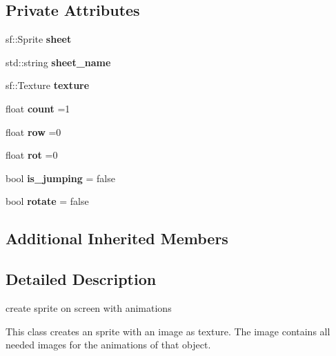 \subsection*{Private Attributes}
\begin{DoxyCompactItemize}
\item 
\mbox{\label{classanimation_aa72ba079cfcb62b5dd7f6d74a9438516}} 
sf\+::\+Sprite {\bfseries sheet}
\item 
\mbox{\label{classanimation_a5406569ef9a8e47a8e50a927063613f6}} 
std\+::string {\bfseries sheet\+\_\+name}
\item 
\mbox{\label{classanimation_a9b49e5a7b856d127ea5481998c911fde}} 
sf\+::\+Texture {\bfseries texture}
\item 
\mbox{\label{classanimation_a50dde9518af0631ff1b86881a0e4c0ce}} 
float {\bfseries count} =1
\item 
\mbox{\label{classanimation_adaa2321a124fb03b2f4b3bd7af4e2127}} 
float {\bfseries row} =0
\item 
\mbox{\label{classanimation_a9a1d350886939f9e988d2786ca9709e7}} 
float {\bfseries rot} =0
\item 
\mbox{\label{classanimation_a8365683c0efa023b2bcb60b3fde9eeb2}} 
bool {\bfseries is\+\_\+jumping} = false
\item 
\mbox{\label{classanimation_a48077a46bbac0719c0a8227456620e14}} 
bool {\bfseries rotate} = false
\end{DoxyCompactItemize}
\subsection*{Additional Inherited Members}


\subsection{Detailed Description}
create sprite on screen with animations 

This class creates an sprite with an image as texture. The image contains all needed images for the animations of that object.

